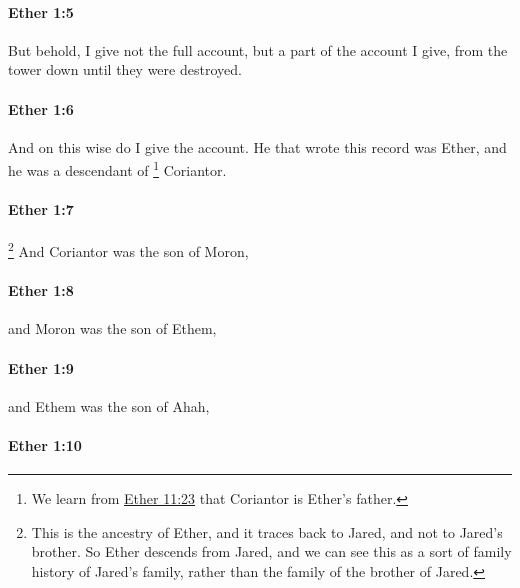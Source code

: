 		\paragraph{Ether 1:5} %
			\label{ETHER-1-5}

			But behold, I give not the full account,
			but a part of the account I give,
			from the tower down until they were destroyed.

		\paragraph{Ether 1:6} %
			\label{ETHER-1-6}

			And on this wise do I give the account.
			He that wrote this record was Ether,
			and he was a descendant of
				\footnote{%
					We learn from \hyperref[ETHER-11-23]{Ether 11:23} that Coriantor is Ether's father.
					}%
			Coriantor.

		\paragraph{Ether 1:7} %
			\label{ETHER-1-7}

				\footnote{%
					This is the ancestry of Ether, and it traces back to Jared, and not to Jared's brother. So Ether descends from Jared, and we can see this as a sort of family history of Jared's family, rather than the family of the brother of Jared.
					}%
			And	Coriantor was the son of Moron,

		\paragraph{Ether 1:8} %
			\label{ETHER-1-8}

			and Moron was the son of Ethem,

		\paragraph{Ether 1:9} %
			\label{ETHER-1-9}

			and Ethem was the son of Ahah,

		\paragraph{Ether 1:10} %
			\label{ETHER-1-10}

